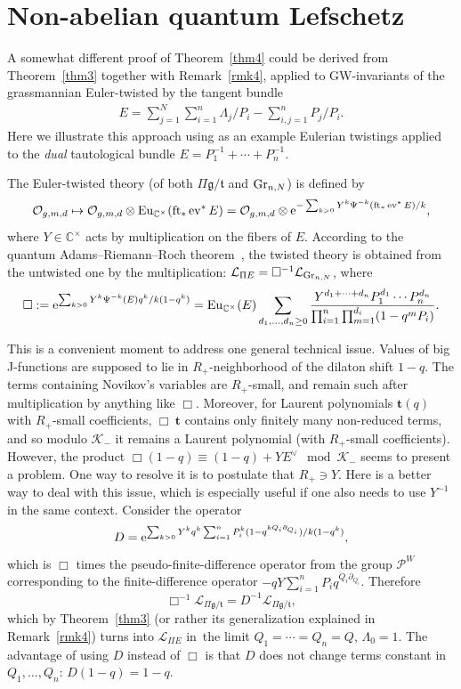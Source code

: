 \documentclass[10pt,a4paper]{amsart}
\numberwithin{equation}{section}
\def\K{\mathcal K}
\def\L{\mathcal L}
\def\O{\mathcal O}
\def\CC{\mathbb C}
\def\p{\partial}
\def\t{{\mathbf t}}
\def\ev{\operatorname{ev}}
\def\ft{\operatorname{ft}}
\def\Eu{\operatorname{Eu}}
\def\square{\Box}
\theoremstyle{definition}
\theoremstyle{plain}
\begin{document}
\section{Non-abelian quantum Lefschetz}\label{Sec6}

A somewhat different proof of Theorem~\ref{thm4} could be derived from Theorem~\ref{thm3} together with Remark~\ref{rmk4}, applied to GW-invariants of the grassmannian Euler-twisted by the tangent bundle
\begin{gather*}
E=\sum_{j=1}^N\sum_{i=1}^n\Lambda_j/P_i-\sum_{i,j=1}^nP_j/P_i.
\end{gather*}
Here we illustrate this approach using as an example Eulerian twistings applied to the {\em dual} tautological bundle $E=P_1^{-1}+\cdots+P_n^{-1}$.

The Euler-twisted theory (of both $\Pi \mathfrak{g}/\mathfrak{t}$ and ${\rm Gr}_{n,N}$) is defined by
\[
\O_{g,m,d}\mapsto \O_{g,m,d}\otimes \Eu_{\CC^{\times}}(\ft_*\ev^*E) = \O_{g,m,d}\otimes {\rm e}^{-\sum_{k>0} Y^k \Psi^{-k}(\ft_*\ev^* E)/k},
\]
where $Y\in \CC^{\times}$ acts by multiplication on the fibers of $E$. According to the quantum Adams--Riemann--Roch theorem~\cite{Givental:perm11}, the twisted theory is obtained from the untwisted one by the multiplication: $\L_{\Pi E}=\square^{-1} \L_{{\rm Gr}_{n,N}}$, where
\[
\square:= {\rm e}^{ \sum_{k>0} Y^k\Psi^{-k}(E) q^k/k(1-q^k)}
= \Eu_{\CC^{\times}}(E) \sum_{d_1,\dots,d_n\geq 0}\frac{Y^{d_1+\cdots+d_n}P_1^{d_1}\cdots P_n^{d_n}}{\prod_{i=1}^n\prod_{m=1}^{d_i}(1-q^mP_i)}.
\]

This is a convenient moment to address one general technical issue. Values of big J-functions are supposed to lie in $R_{+}$-neighborhood of the dilaton shift $1-q$. The terms containing Novikov's variables are $R_{+}$-small, and remain such after multiplication by anything like $\square$. Moreover, for Laurent polynomials $\t(q)$ with $R_{+}$-small coefficients, $\square\ \t$ contains only finitely many non-reduced terms, and so modulo $\K_{-}$ it remains a Laurent polynomial (with $R_{+}$-small coefficients). However, the product $\square (1-q) \equiv (1-q) + Y E^{\vee} \mod \K_{-}$ seems to present a problem. One way to resolve it is to postulate that $R_{+}\ni Y$. Here is a better way to deal with this issue, which is especially useful if one also needs to use $Y^{-1}$ in the same context. Consider the operator
\[
D={\rm e}^{ \sum_{k>0} Y^k q^k \sum_{i=1}^n P_i^k(1-q^{k Q_i\p_{Q_i}})/k(1-q^k)},
\]
which is $\square$ times the pseudo-finite-difference operator from the group ${\mathcal P}^W$ corresponding to the finite-difference operator $-qY\sum_{i=1}^n P_i q^{Q_i\p_{Q_i}}$. Therefore
\[
\square^{-1} \L_{\Pi \mathfrak{g}/\mathfrak{t}} = D^{-1}\L_{\Pi \mathfrak{g}/\mathfrak{t}},
\]
which by Theorem~\ref{thm3} (or rather its generalization explained in Remark~\ref{rmk4}) turns into $\L_{\Pi E}$ in~the limit $Q_1=\cdots=Q_n=Q$, $\Lambda_0=1$. The advantage of using $D$ instead of $\square$ is that $D$ does not change terms constant in $Q_1,\dots,Q_n$: $D(1-q)=1-q$.
\end{document}
